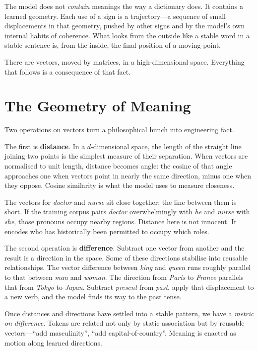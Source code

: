 \documentclass[12pt,a4paper]{article}
\begin{document}
The model does not \emph{contain} meanings the way a dictionary does. It contains a learned geometry. Each use of a sign is a trajectory---a sequence of small displacements in that geometry, pushed by other signs and by the model's own internal habits of coherence. What looks from the outside like a stable word in a stable sentence is, from the inside, the final position of a moving point.

There are vectors, moved by matrices, in a high-dimensional space. Everything that follows is a consequence of that fact.

\section{The Geometry of Meaning}

Two operations on vectors turn a philosophical hunch into engineering fact.

The first is \textbf{distance}. In a $d$-dimensional space, the length of the straight line joining two points is the simplest measure of their separation. When vectors are normalised to unit length, distance becomes angle: the cosine of that angle approaches one when vectors point in nearly the same direction, minus one when they oppose. Cosine similarity is what the model uses to measure closeness.

The vectors for \emph{doctor} and \emph{nurse} sit close together; the line between them is short. If the training corpus pairs \emph{doctor} overwhelmingly with \emph{he} and \emph{nurse} with \emph{she}, those pronouns occupy nearby regions. Distance here is not innocent. It encodes who has historically been permitted to occupy which roles.

The second operation is \textbf{difference}. Subtract one vector from another and the result is a direction in the space. Some of these directions stabilise into reusable relationships. The vector difference between \emph{king} and \emph{queen} runs roughly parallel to that between \emph{man} and \emph{woman}. The direction from \emph{Paris} to \emph{France} parallels that from \emph{Tokyo} to \emph{Japan}. Subtract \emph{present} from \emph{past}, apply that displacement to a new verb, and the model finds its way to the past tense.

Once distances and directions have settled into a stable pattern, we have a \emph{metric on difference}. Tokens are related not only by static association but by reusable vectors---``add masculinity'', ``add capital-of-country''. Meaning is enacted as motion along learned directions.
\end{document}
